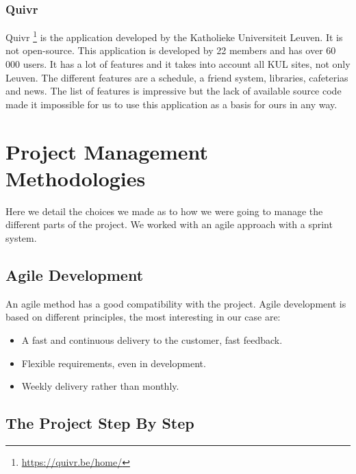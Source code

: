 \documentclass{eplmastersthesis}
\begin{document}
\subsubsection{Quivr}
Quivr \footnote{\url{https://quivr.be/home/}} is the application developed by the Katholieke Universiteit Leuven. It is not open-source. This application is developed by 22 members and has over 60 000 users. It has a lot of features and it takes into account all KUL sites, not only Leuven. The different features are a schedule, a friend system, libraries, cafeterias and news. The list of features is impressive but the lack of available source code made it impossible for us to use this application as a basis for ours in any way.


\section{Project Management Methodologies}

Here we detail the choices we made as to how we were going to manage the different parts of the project. We worked with an agile approach with a sprint system. 

\newpage

\subsection{Agile Development}
An agile method has a good compatibility with the project. Agile development is based on different principles, the most interesting in our case are:

\begin{itemize}
\item A fast and continuous delivery to the customer, fast feedback.
\item Flexible requirements, even in development.
\item Weekly delivery rather than monthly.
\end{itemize}

\subsection{The Project Step By Step}
\end{document}
